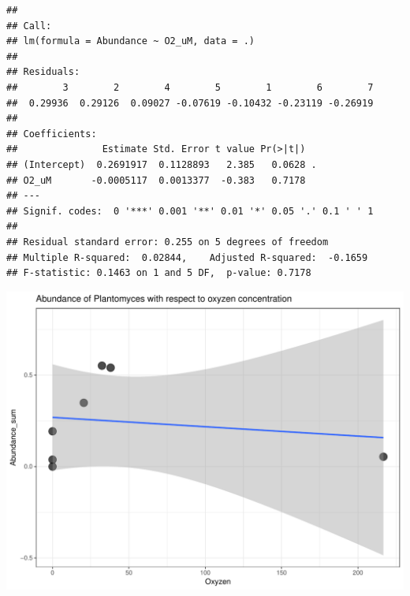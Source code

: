 \documentclass[11 pt,]{article}
\newenvironment{Shaded}{\begin{snugshade}}{\end{snugshade}}
\newcommand{\KeywordTok}[1]{\textcolor[rgb]{0.13,0.29,0.53}{\textbf{#1}}}
\newcommand{\DataTypeTok}[1]{\textcolor[rgb]{0.13,0.29,0.53}{#1}}
\newcommand{\DecValTok}[1]{\textcolor[rgb]{0.00,0.00,0.81}{#1}}
\newcommand{\FloatTok}[1]{\textcolor[rgb]{0.00,0.00,0.81}{#1}}
\newcommand{\StringTok}[1]{\textcolor[rgb]{0.31,0.60,0.02}{#1}}
\newcommand{\OperatorTok}[1]{\textcolor[rgb]{0.81,0.36,0.00}{\textbf{#1}}}
\newcommand{\NormalTok}[1]{#1}
\begin{document}
\begin{verbatim}
## 
## Call:
## lm(formula = Abundance ~ O2_uM, data = .)
## 
## Residuals:
##        3        2        4        5        1        6        7 
##  0.29936  0.29126  0.09027 -0.07619 -0.10432 -0.23119 -0.26919 
## 
## Coefficients:
##               Estimate Std. Error t value Pr(>|t|)  
## (Intercept)  0.2691917  0.1128893   2.385   0.0628 .
## O2_uM       -0.0005117  0.0013377  -0.383   0.7178  
## ---
## Signif. codes:  0 '***' 0.001 '**' 0.01 '*' 0.05 '.' 0.1 ' ' 1
## 
## Residual standard error: 0.255 on 5 degrees of freedom
## Multiple R-squared:  0.02844,    Adjusted R-squared:  -0.1659 
## F-statistic: 0.1463 on 1 and 5 DF,  p-value: 0.7178
\end{verbatim}

\begin{Shaded}
\end{Shaded}

\includegraphics{Figs/unnamed-chunk-13-1.pdf}
\end{document}
